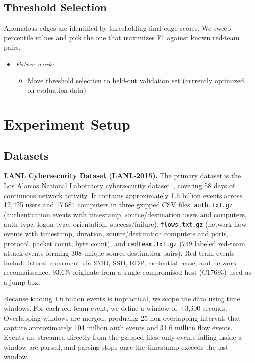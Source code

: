 \documentclass[letterpaper,twocolumn,10pt]{article}
\begin{document}
\subsection{Threshold Selection}

Anomalous edges are identified by thresholding final edge scores. We sweep percentile values and pick the one that maximizes F1 against known red-team pairs.

\begin{itemize}
\item \textit{Future work:}
\begin{itemize}
\item Move threshold selection to held-out validation set (currently optimized on evaluation data)
\end{itemize}
\end{itemize}


\section{Experiment Setup}

\subsection{Datasets}

\textbf{LANL Cybersecurity Dataset (LANL-2015).}
The primary dataset is the Los Alamos National Laboratory cybersecurity dataset~\cite{kent-2015-cyberdata1}, covering 58 days of continuous network activity. It contains approximately 1.6 billion events across 12,425 users and 17,684 computers in three gzipped CSV files: \texttt{auth.txt.gz} (authentication events with timestamp, source/destination users and computers, auth type, logon type, orientation, success/failure), \texttt{flows.txt.gz} (network flow events with timestamp, duration, source/destination computers and ports, protocol, packet count, byte count), and \texttt{redteam.txt.gz} (749 labeled red-team attack events forming 308 unique source-destination pairs). Red-team events include lateral movement via SMB, SSH, RDP, credential reuse, and network reconnaissance; 93.6\% originate from a single compromised host (C17693) used as a jump box.

Because loading 1.6 billion events is impractical, we scope the data using time windows. For each red-team event, we define a window of $\pm$3,600 seconds. Overlapping windows are merged, producing 25 non-overlapping intervals that capture approximately 104 million auth events and 31.6 million flow events. Events are streamed directly from the gzipped files: only events falling inside a window are parsed, and parsing stops once the timestamp exceeds the last window.
\end{document}
